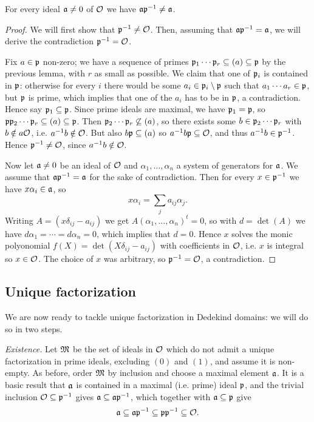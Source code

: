 \begin{lem}[Neukirch 3.5]
	For every ideal $\mathfrak{a}\neq 0$ of $\mathcal{O}$ we have $\mathfrak{a}\mathfrak{p}^{-1}\neq\mathfrak{a}$.
\end{lem}
\begin{proof}
	We will first show that $\mathfrak{p}^{-1}\neq\mathcal{O}$. Then, assuming that $\mathfrak{a}\mathfrak{p}^{-1}=\mathfrak{a}$, we will derive the contradiction $\mathfrak{p}^{-1}=\mathcal{O}$.

	Fix $a\in\mathfrak{p}$ non-zero; we have a sequence of primes $\mathfrak{p}_1\cdots\mathfrak{p}_r\subseteq (a)\subseteq\mathfrak{p}$ by the previous lemma, with $r$ as small as possible. We claim that one of $\mathfrak{p}_i$ is contained in $\mathfrak{p}$: otherwise for every $i$ there would be some $a_i\in\mathfrak{p}_i\setminus\mathfrak{p}$ such that $a_1\cdots a_r\in\mathfrak{p}$, but $\mathfrak{p}$ is prime, which implies that one of the $a_i$ has to be in $\mathfrak{p}$, a contradiction. Hence say $\mathfrak{p}_1\subseteq\mathfrak{p}$. Since prime ideals are maximal, we have $\mathfrak{p}_1=\mathfrak{p}$, so $\mathfrak{p}\mathfrak{p}_2\cdots\mathfrak{p}_r\subseteq(a)\subseteq\mathfrak{p}$. Then $\mathfrak{p}_2\cdots\mathfrak{p}_r\not\subseteq(a)$, so there exists some $b\in\mathfrak{p}_2\cdots\mathfrak{p}_r$ with $b\notin a\mathcal{O}$, i.e. $a^{-1} b\notin\mathcal{O}$. But also $b\mathfrak{p}\subseteq(a)$ so $a^{-1} b\mathfrak{p}\subseteq\mathcal{O}$, and thus $a^{-1} b\in\mathfrak{p}^{-1}$. Hence $\mathfrak{p}^{-1}\neq\mathcal{O}$, since $a^{-1} b\notin\mathcal{O}$.

	Now let $\mathfrak{a}\neq 0$ be an ideal of $\mathcal{O}$ and $\alpha_1,\dots,\alpha_n$ a system of generators for $\mathfrak{a}$. We assume that $\mathfrak{a}\mathfrak{p}^{-1}=\mathfrak{a}$ for the sake of contradiction. Then for every $x\in\mathfrak{p}^{-1}$ we have $x\alpha_i\in\mathfrak{a}$, so
	\[
		x\alpha_i = \sum_j a_{ij}\alpha_j.
	\]
	Writing $A=(x\delta_{ij} - a_{ij})$ we get $A(\alpha_1,\dots,\alpha_n)^t=0$, so with $d=\det(A)$ we have $d\alpha_1=\cdots=d\alpha_n=0$, which implies that $d=0$. Hence $x$ solves the monic polyonomial $f(X)=\det(X\delta_{ij}-a_{ij})$ with coefficients in $\mathcal{O}$, i.e. $x$ is integral so $x\in\mathcal{O}$. The choice of $x$ was arbitrary, so $\mathfrak{p}^{-1}=\mathcal{O}$, a contradiction.
	
\end{proof}

\subsection{Unique factorization}

We are now ready to tackle unique factorization in Dedekind domains: we will do so in two steps.

\emph{Existence.} Let $\mathfrak{M}$ be the set of ideals in $\mathcal{O}$ which do not admit a unique factorization in prime ideals, excluding $(0)$ and $(1)$, and assume it is non-empty. As before, order $\mathfrak{M}$ by inclusion and choose a maximal element $\mathfrak{a}$. It is a basic result that $\mathfrak{a}$ is contained in a maximal (i.e. prime) ideal $\mathfrak{p}$, and the trivial inclusion $\mathcal{O}\subseteq\mathfrak{p}^{-1}$ gives $\mathfrak{a}\subseteq\mathfrak{a}\mathfrak{p}^{-1}$, which together with $\mathfrak{a}\subseteq\mathfrak{p}$ give
\[
	\mathfrak{a}\subseteq\mathfrak{a}\mathfrak{p}^{-1}\subseteq\mathfrak{p}\mathfrak{p}^{-1}\subseteq\mathcal{O}.
\]

